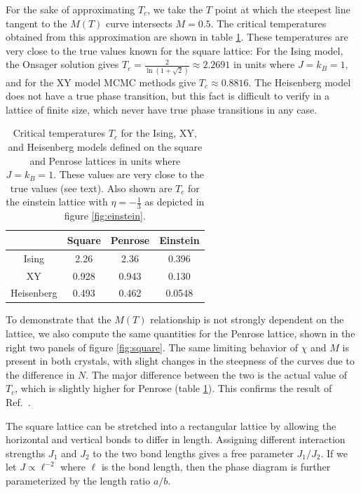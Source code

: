 \documentclass[
  amsmath,
  amssymb,
  aps,
  twocolumn,
  nofootinbib,
  nolongbibliography,
  floatfix,
]{revtex4-2}
\begin{document}
For the sake of approximating $T_c$, we take the $T$ point at which the steepest line tangent to the $M(T)$ curve intersects $M=0.5$. The critical temperatures obtained from this approximation are shown in table \ref{tab:tc}. These temperatures are very close to the true values known for the square lattice: For the Ising model, the Onsager solution gives $T_c = \frac{2}{\ln(1 + \sqrt{2})} \approx 2.2691$ in units where $J=k_B=1$, and for the XY model MCMC methods give $T_c \approx 0.8816$. The Heisenberg model does not have a true phase transition, but this fact is difficult to verify in a lattice of finite size, which never have true phase transitions in any case. 
\begin{table}
  \centering
  \begin{tabular}{c|ccc}
    \hline \hline
    & Square & Penrose & Einstein\\ \hline
    Ising & 2.26 & 2.36 & 0.396\\
    XY & 0.928 & 0.943 & 0.130\\
    Heisenberg & 0.493 & 0.462 & 0.0548\\ \hline \hline
  \end{tabular}
  \caption{Critical temperatures $T_c$ for the Ising, XY, and Heisenberg models defined on the square and Penrose lattices in units where $J = k_B = 1$. These values are very close to the true values (see text). Also shown are $T_c$ for the einstein lattice with $\eta=-\frac{1}{3}$ as depicted in figure \ref{fig:einstein}.}
  \label{tab:tc}
\end{table}

To demonstrate that the $M(T)$ relationship is not strongly dependent on the lattice, we also compute the same quantities for the Penrose lattice, shown in the right two panels of figure \ref{fig:square}. The same limiting behavior of $\chi$ and $M$ is present in both crystals, with slight changes in the steepness of the curves due to the difference in $N$. The major difference between the two is the actual value of $T_c$, which is slightly higher for Penrose (table \ref{tab:tc}). This confirms the result of Ref.~\cite{penrose-ising}.

The square lattice can be stretched into a rectangular lattice by allowing the horizontal and vertical bonds to differ in length. Assigning different interaction strengths $J_1$ and $J_2$ to the two bond lengths gives a free parameter $J_1/J_2$. If we let $J \propto \ell^{-2}$ where $\ell$ is the bond length, then the phase diagram is further parameterized by the length ratio $a/b$.
\end{document}
